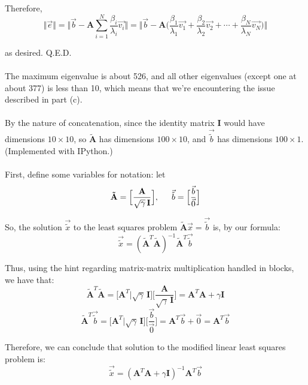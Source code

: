 \documentclass{article}
\begin{document}
Therefore,
$$\Vert \vec{e} \Vert =
\Vert \vec{b} - \mathbf{A}
	\sum\limits_{i=1}^N \frac{\beta_i}{\lambda_i} \vec{v_i}
	\Vert =
\Big\Vert \vec{b} - \mathbf{A} \big(
	\frac{\beta_1}{\lambda_1}\vec{v_1} +
	\frac{\beta_2}{\lambda_2}\vec{v_2} + \cdots +
	\frac{\beta_N}{\lambda_N}\vec{v_N}
\big) \Big\Vert$$

as desired. Q.E.D. \\

 \\

The maximum eigenvalue is about 526, and all other eigenvalues (except one at about 377) is less than 10, which means that we're encountering the issue described in part (c). \\

 \\

By the nature of concatenation,
since the identity matrix $\mathbf{I}$ would have dimensions $10\times10$,
so $\tilde{\mathbf{A}}$ has dimensions $100\times10$, and
$\vec{\tilde{b}}$ has dimensions $100\times1$. (Implemented with IPython.) \\

 \\

First, define some variables for notation: let
$$\mathbf{\tilde{A}} =
\Big[ \frac{\mathbf{A}}{\sqrt{\gamma}\,\mathbf{I}} \Big],
\indent \vec{\tilde{b}} =
\Big[ \frac{\vec{b}}{\vec{0}} \Big]$$

So, the solution $\vec{\tilde{x}}$ to the least squares problem $\mathbf{\tilde{A}}\vec{x} = \vec{\tilde{b}}$ is, by our formula:
$$\vec{\tilde{x}} =
(\mathbf{\tilde{A}}^T \mathbf{\tilde{A}})^{-1} \mathbf{\tilde{A}}^T \vec{\tilde{b}}$$

Thus, using the hint regarding matrix-matrix multiplication handled in blocks, we have that:
$$\mathbf{\tilde{A}}^T \mathbf{\tilde{A}} =
\Big[ \mathbf{A}^T \Big|\sqrt{\gamma}\,\mathbf{I} \Big]
\Big[ \frac{\mathbf{A}}{\sqrt{\gamma}\,\mathbf{I}} \Big] =
\mathbf{A}^T\mathbf{A} + \gamma\mathbf{I}$$
$$\mathbf{\tilde{A}}^T \vec{\tilde{b}} =
\Big[ \mathbf{A}^T \Big|\sqrt{\gamma}\,\mathbf{I} \Big]
\Big[ \frac{\vec{b}}{\vec{0}} \Big] =
\mathbf{A}^T \vec{b} + \vec{0} =
\mathbf{A}^T \vec{b} $$

Therefore, we can conclude that solution to the modified linear least squares problem is:
$$\vec{\tilde{x}} =
(\mathbf{A}^T\mathbf{A} + \gamma\mathbf{I})^{-1}
\mathbf{A}^T \vec{b} $$
\end{document}
